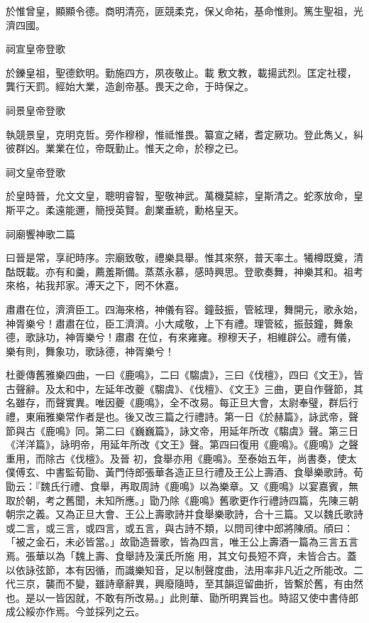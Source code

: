 \begin{pinyinscope}
 於惟曾皇，顯顯令德。商明清亮，匪競柔克，保乂命祐，基命惟則。篤生聖祖，光濟四國。



 祠宣皇帝登歌



 於鑠皇祖，聖德欽明。勤施四方，夙夜敬止。載
 敷文教，載揚武烈。匡定社稷，龔行天罰。經始大業，造創帝基。畏天之命，于時保之。



 祠景皇帝登歌



 執競景皇，克明克哲。旁作穆穆，惟祗惟畏。纂宣之緒，耆定厥功。登此雋乂，糾彼群凶。業業在位，帝既勤止。惟天之命，於穆之已。



 祠文皇帝登歌



 於皇時晉，允文文皇，聰明睿智，聖敬神武。萬機莫綜，皇斯清之。蛇豕放命，皇斯平之。柔遠能邇，簡授英賢。創業垂統，勳格皇天。



 祠廟饗神歌二篇



 曰晉是常，享祀時序。宗廟致敬，禮樂具舉。惟其來祭，普天率土。犧樽既奠，清酤既載。亦有和羹，薦羞斯備。蒸蒸永慕，感時興思。登歌奏舞，神樂其和。祖考來格，祐我邦家。溥天之下，罔不休嘉。



 肅肅在位，濟濟臣工。四海來格，神儀有容。鐘鼓振，管絃理，舞開元，歌永始，神胥樂兮！肅肅在位，臣工濟濟。小大咸敬，上下有禮。理管絃，振鼓鐘，舞象德，歌詠功，神胥樂兮！肅肅
 在位，有來雍雍。穆穆天子，相維辟公。禮有儀，樂有則，舞象功，歌詠德，神胥樂兮！



 杜夔傳舊雅樂四曲，一曰《鹿鳴》，二曰《騶虞》，三曰《伐檀》，四曰《文王》，皆古聲辭。及太和中，左延年改夔《騶虞》、《伐檀》、《文王》三曲，更自作聲節，其名雖存，而聲實異。唯因夔《鹿鳴》，全不改易。每正旦大會，太尉奉璧，群后行禮，東廂雅樂常作者是也。後又改三篇之行禮詩。第一日《於赫篇》，詠武帝，聲節與古《鹿鳴》同。第二曰《巍巍篇》，詠文帝，用延年所改《騶虞》聲。第三日《洋洋篇》，詠明帝，用延年所改《文王》聲。第四曰復用《鹿鳴》。《鹿鳴》之聲重用，而除古《伐檀》。及晉
 初，食舉亦用《鹿鳴》。至泰始五年，尚書奏，使太僕傅玄、中書監荀勖、黃門侍郎張華各造正旦行禮及王公上壽酒、食舉樂歌詩。荀勖云：『魏氏行禮、食舉，再取周詩《鹿鳴》以為樂章。又《鹿鳴》以宴嘉賓，無取於朝，考之舊聞，未知所應。」勖乃除《鹿鳴》舊歌更作行禮詩四篇，先陳三朝朝宗之義。又為正旦大會、王公上壽歌詩并食舉樂歌詩，合十三篇。又以魏氏歌詩或二言，或三言，或四言，或五言，與古詩不類，以問司律中郎將陳頎。頎曰：「被之金石，未必皆當。」故勖造晉歌，皆為四言，唯王公上壽酒一篇為三言五言焉。張華以為「魏上壽、食舉詩及漢氏所施
 用，其文句長短不齊，未皆合古。蓋以依詠弦節，本有因循，而識樂知音，足以制聲度曲，法用率非凡近之所能改。二代三京，襲而不變，雖詩章辭異，興廢隨時，至其韻逗留曲折，皆繫於舊，有由然也。是以一皆因就，不敢有所改易。」此則華、勖所明異旨也。時詔又使中書侍郎成公綏亦作焉。今並採列之云。




\end{pinyinscope}

